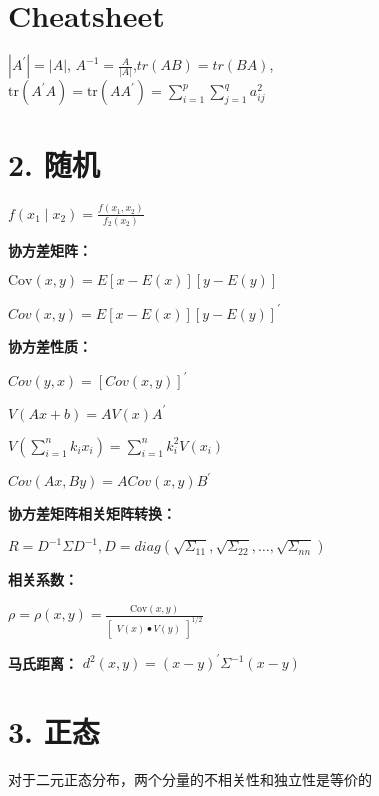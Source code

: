 \documentclass[10pt,a4paper]{ctexart} %
\begin{document}
	\tiny %
	\begin{multicols*}{3} %
		
		\section*{\centering \normalsize Cheatsheet}
		
		$|A^{\prime}|=|A|$, $A^{-1}=\frac{A}{|A|}$,$tr(AB)=tr(BA)$,$\mathrm{tr}(A^{\prime}A)=\mathrm{tr}(AA^{\prime})=\sum_{i=1}^{p}\sum_{j=1}^{q}a_{ij}^{2}$
		
		
		\section*{\centering \normalsize 2. 随机}
		
		$f\left(x_{1}\mid x_{2}\right)=\frac{f\left(x_{1},x_{2}\right)}{f_{2}\left(x_{2}\right)}$
		
		\textbf{协方差矩阵：}
		
		$\mathrm{Cov}(x,y)=E\left[x-E\left(x\right)\right]\left[y-E\left(y\right)\right]$
		
		$Cov(x,y)=E\left[x-E\left(x\right)\right]\left[y-E\left(y\right)\right]^{\prime}$
		
		\textbf{协方差性质：}
		
		$Cov(y,x)=\left[Cov(x,y)\right]^{\prime}$
		
		$V(Ax+b)=AV(x)A^{\prime}$
		
		$V\left(\sum_{i=1}^nk_ix_i\right)=\sum_{i=1}^nk_i^2V\left(x_i\right)$
		
		$Cov\left(Ax,By\right)=ACov\left(x,y\right)B^{\prime}$
		
		\textbf{协方差矩阵相关矩阵转换：}
		
		$R=D^{-1}\Sigma D^{-1}, D = diag(\sqrt{\Sigma_{11}},\sqrt{\Sigma_{22}},\dots,\sqrt{\Sigma_{nn}})$
		
		\textbf{相关系数：}
		
		$\rho=\rho(x,y)=\frac{\mathrm{Cov}(x,y)}{\begin{bmatrix}V(x)\bullet V(y)\end{bmatrix}^{1/2}}$
		
		\textbf{马氏距离：}
		$d^{2}\left(x,y\right)=\left(x-y\right)^{\prime}\Sigma^{-1}\left(x-y\right)$
		
		\section*{\centering \normalsize 3. 正态}
		对于二元正态分布，两个分量的不相关性和独立性是等价的
		

\end{multicols*}
\end{document}
